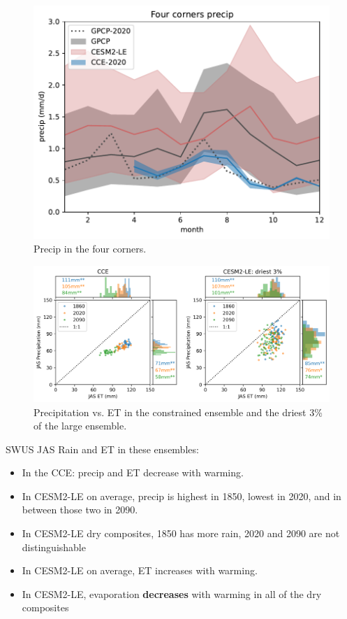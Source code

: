 \documentclass[11pt]{article}
\begin{document}
\begin{figure}[h]
\centering
\includegraphics[width=40pc]{figs/main/precip.pdf}
\caption{Precip in the four corners.}
\label{fig:precip}
\end{figure}


\newpage
\begin{figure}[h]
\centering
\includegraphics[width=40pc]{figs/main/scatter_ET_P.png}
\caption{Precipitation vs. ET in the constrained ensemble and the driest 3\% of the large ensemble.}
\label{fig:precip}
\end{figure}



SWUS JAS Rain and ET in these ensembles:
\begin{itemize}
    \item In the CCE: precip and ET decrease with warming.
    \item In CESM2-LE on average, precip is highest in 1850, lowest in 2020, and in between those two in 2090.
    \item In CESM2-LE dry composites, 1850 has more rain, 2020 and 2090 are not distinguishable
    \item In CESM2-LE on average, ET increases with warming.
    \item In CESM2-LE, evaporation \textbf{decreases} with warming in all of the dry composites    
\end{itemize}



\nocite{*}

\end{document}
